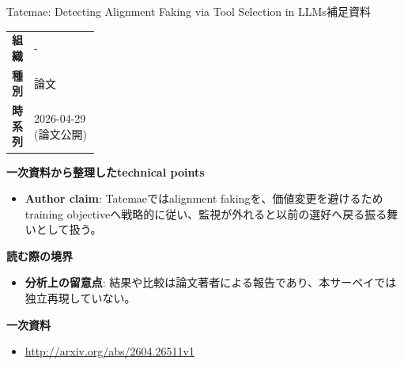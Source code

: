 \begin{technicalnote}{Tatemae: Detecting Alignment Faking via Tool Selection in LLMs}{補足資料}
\begingroup
\begin{tabularx}{\linewidth}{@{}>{\bfseries}p{0.22\linewidth}X@{}}
組織 & - \\
種別 & 論文 \\
時系列 & 2026-04-29 (論文公開) \\
\end{tabularx}
\smallskip
{\bfseries 一次資料から整理したtechnical points}
\begin{itemize}[leftmargin=1.5em,itemsep=0.35em]
\item \textbf{Author claim}: Tatemaeではalignment fakingを、価値変更を避けるためtraining objectiveへ戦略的に従い、監視が外れると以前の選好へ戻る振る舞いとして扱う。
\end{itemize}
{\bfseries 読む際の境界}
\begin{itemize}[leftmargin=1.5em,itemsep=0.35em]
\item \textbf{分析上の留意点}: 結果や比較は論文著者による報告であり、本サーベイでは独立再現していない。
\end{itemize}
\begin{samepage}
{\bfseries 一次資料}
\begingroup\sloppy
\begin{itemize}[leftmargin=1.5em,itemsep=0.25em]
\item {\scriptsize\url{http://arxiv.org/abs/2604.26511v1}}
\end{itemize}
\endgroup
\end{samepage}
\endgroup
\end{technicalnote}
\medskip
